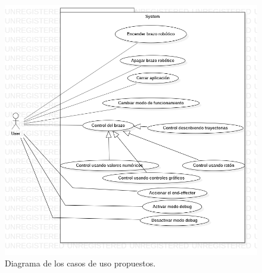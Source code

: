 

\begin{figure}[H]
    \centering
    \includegraphics[width=.7\textwidth]{images/UseCaseDiagram1.png}
    \caption{Diagrama de los casos de uso propuestos.}
    \label{fig:diagrama_casos_uso}
\end{figure}


